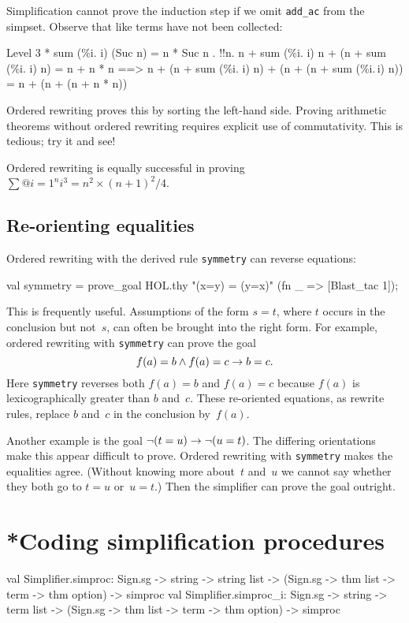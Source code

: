 Simplification cannot prove the induction step if we omit \texttt{add_ac} from
the simpset.  Observe that like terms have not been collected:
\begin{ttbox}
{\out Level 3}
{ * sum (\%i. i) (Suc n) = n * Suc n}
{. !!n. n + sum (\%i. i) n + (n + sum (\%i. i) n) = n + n * n}
{\out           ==> n + (n + sum (\%i. i) n) + (n + (n + sum (\%i.\,i) n)) =}
{\out               n + (n + (n + n * n))}
\end{ttbox}
Ordered rewriting proves this by sorting the left-hand side.  Proving
arithmetic theorems without ordered rewriting requires explicit use of
commutativity.  This is tedious; try it and see!

Ordered rewriting is equally successful in proving
$\sum@{i=1}^n i^3 = n^2\times(n+1)^2/4$.


\subsection{Re-orienting equalities}
Ordered rewriting with the derived rule \texttt{symmetry} can reverse
equations:
\begin{ttbox}
val symmetry = prove_goal HOL.thy "(x=y) = (y=x)"
                 (fn _ => [Blast_tac 1]);
\end{ttbox}
This is frequently useful.  Assumptions of the form $s=t$, where $t$ occurs
in the conclusion but not~$s$, can often be brought into the right form.
For example, ordered rewriting with \texttt{symmetry} can prove the goal
\[ f(a)=b \wedge f(a)=c \rightarrow b=c. \]
Here \texttt{symmetry} reverses both $f(a)=b$ and $f(a)=c$
because $f(a)$ is lexicographically greater than $b$ and~$c$.  These
re-oriented equations, as rewrite rules, replace $b$ and~$c$ in the
conclusion by~$f(a)$. 

Another example is the goal $\neg(t=u) \rightarrow \neg(u=t)$.
The differing orientations make this appear difficult to prove.  Ordered
rewriting with \texttt{symmetry} makes the equalities agree.  (Without
knowing more about~$t$ and~$u$ we cannot say whether they both go to $t=u$
or~$u=t$.)  Then the simplifier can prove the goal outright.



\section{*Coding simplification procedures}
\begin{ttbox}
  val Simplifier.simproc: Sign.sg -> string -> string list
    -> (Sign.sg -> thm list -> term -> thm option) -> simproc
  val Simplifier.simproc_i: Sign.sg -> string -> term list
    -> (Sign.sg -> thm list -> term -> thm option) -> simproc
\end{ttbox}

